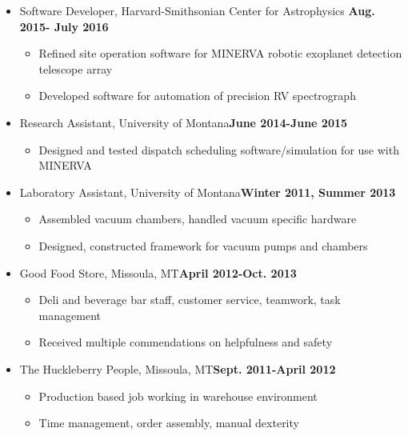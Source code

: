 \documentclass{article}
\begin{document}
\begin{itemize}
\item[] {\large{Software Developer}}, Harvard-Smithsonian Center for Astrophysics \hfill{\bf{Aug. 2015- July 2016}}
\begin{itemize}
\item Refined site operation software for MINERVA robotic exoplanet detection telescope array
\item Developed software for automation of precision RV spectrograph
\end{itemize}
\item[] {\large{Research Assistant}}, University of Montana\hfill {\bf{June 2014-June 2015}} 
\begin{itemize}
\item Designed and tested dispatch scheduling software/simulation for use with MINERVA
\end{itemize}

\item[]{\large{Laboratory Assistant}}, University of Montana\hfill{\bf{Winter 2011, Summer 2013}}
\begin{itemize} 
\item Assembled vacuum chambers, handled vacuum specific hardware
\item Designed, constructed framework for vacuum pumps and chambers
\end{itemize}


\item[]{\large{Good Food Store}}, Missoula, MT\hfill{\bf{April 2012-Oct. 2013}}
\begin{itemize}
\item Deli and beverage bar staff, customer service, teamwork, task management
\item Received multiple commendations on helpfulness and safety
\end{itemize}

\item[] {\large{The Huckleberry People}}, Missoula, MT\hfill{\bf{Sept. 2011-April 2012}}
\begin{itemize}
\item Production based job working in warehouse environment
\item Time management, order assembly, manual dexterity
\end{itemize}


\end{itemize}
\end{document}
